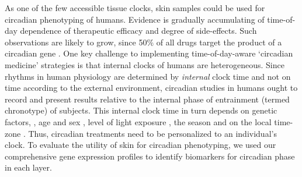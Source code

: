 As one of the few accessible tissue clocks, skin samples could be used for circadian phenotyping of humans. Evidence is gradually accumulating of time-of-day dependence of therapeutic efficacy and degree of side-effects\cite{Montaigne2018,Dallmann2016,Long2016}. Such observations are likely to grow, since 50\% of all drugs target the product of a circadian gene \cite{Ruben2018, Zhang2014}. One key challenge to implementing time-of-day-aware `circadian medicine' strategies is that internal clocks of humans are heterogeneous. Since rhythms in human physiology are determined by \textit{internal} clock time and not on time according to the external environment, circadian studies in humans ought to record and present results relative to the internal phase of entrainment (termed chronotype) of subjects. This internal clock time in turn depends on genetic factors, \cite{Hsu2015, Brown2008}, age and sex \cite{Roenneberg2007}, level of light exposure \cite{Stothard2017, Wright2013}, the season \cite{Stothard2017, Allebrandt2014} and on the local time-zone \cite{Roenneberg2007}. Thus, circadian treatments need to be personalized to an individual's clock.  To evaluate the utility of skin for circadian phenotyping, we used our comprehensive gene expression profiles to identify biomarkers for circadian phase in each layer.



